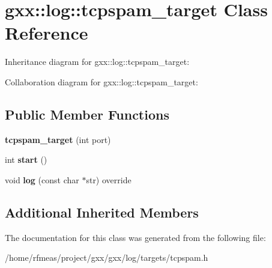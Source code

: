 \hypertarget{classgxx_1_1log_1_1tcpspam__target}{}\section{gxx\+:\+:log\+:\+:tcpspam\+\_\+target Class Reference}
\label{classgxx_1_1log_1_1tcpspam__target}


Inheritance diagram for gxx\+:\+:log\+:\+:tcpspam\+\_\+target\+:


Collaboration diagram for gxx\+:\+:log\+:\+:tcpspam\+\_\+target\+:
\subsection*{Public Member Functions}
\begin{DoxyCompactItemize}
\item 
{\bfseries tcpspam\+\_\+target} (int port)\hypertarget{classgxx_1_1log_1_1tcpspam__target_a5b2aaa4f8fbcf549dd700e9a17a34a2a}{}\label{classgxx_1_1log_1_1tcpspam__target_a5b2aaa4f8fbcf549dd700e9a17a34a2a}

\item 
int {\bfseries start} ()\hypertarget{classgxx_1_1log_1_1tcpspam__target_a820ca56196086ae481ac5d5603a24555}{}\label{classgxx_1_1log_1_1tcpspam__target_a820ca56196086ae481ac5d5603a24555}

\item 
void {\bfseries log} (const char $\ast$str) override\hypertarget{classgxx_1_1log_1_1tcpspam__target_a47dd4f4c2fa80d90e7dcbadd8acdc9aa}{}\label{classgxx_1_1log_1_1tcpspam__target_a47dd4f4c2fa80d90e7dcbadd8acdc9aa}

\end{DoxyCompactItemize}
\subsection*{Additional Inherited Members}


The documentation for this class was generated from the following file\+:\begin{DoxyCompactItemize}
\item 
/home/rfmeas/project/gxx/gxx/log/targets/tcpspam.\+h\end{DoxyCompactItemize}
